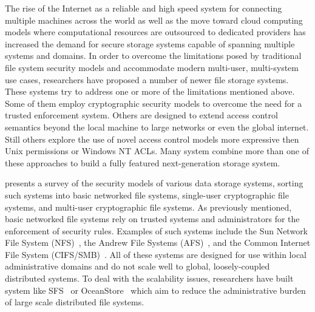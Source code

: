 The rise of the Internet as a reliable and high speed system for
connecting multiple machines across the world as well as the move
toward cloud computing models where computational resources are
outsourced to dedicated providers has increased the demand for secure
storage systems capable of spanning multiple systems and domains. In
order to overcome the limitations posed by traditional file system
security models and accommodate modern multi-user, multi-system use
cases, researchers have proposed a number of newer file storage
systems. These systems try to address one or more of the limitations
mentioned above. Some of them employ cryptographic security models to
overcome the need for a trusted enforcement system. Others are
designed to extend access control semantics beyond the local machine
to large networks or even the global internet. Still others explore
the use of novel access control models more expressive then Unix
permissions or Windows NT ACLs. Many system combine more than one of
these approaches to build a fully featured next-generation storage
system.

\cite{kher2005} presents a survey of the security models of various
data storage systems, sorting such systems into basic networked file
systems, single-user cryptographic file systems, and multi-user
cryptographic file systems. As previously mentioned, basic networked
file systems rely on trusted systems and administrators for the
enforcement of security rules. Examples of such systems include the
Sun Network File System (NFS)~\cite{sandberg1985}, the Andrew File
Systems (AFS)~\cite{howard1988}, and the Common Internet File System
(CIFS/SMB)~\cite{microsoft-smb2}. All of these systems are designed
for use within local administrative domains and do not scale well to
global, loosely-coupled distributed systems. To deal with the
scalability issues, researchers have built system like
SFS~\cite{mazieres1999} or OceanStore~\cite{kubiatowicz2000} which aim
to reduce the administrative burden of large scale distributed file
systems.

